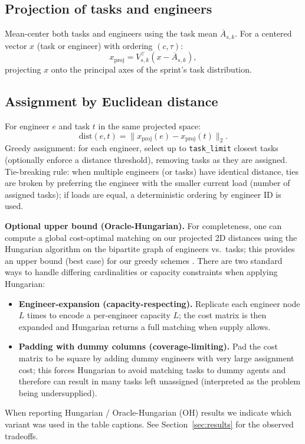 \documentclass[journal]{IEEEtran}
\begin{document}
\subsection{Projection of tasks and engineers}
Mean-center both tasks and engineers using the task mean \(\overline{A}_{s,k}\). For a centered vector $x$ (task or engineer) with ordering \((c,\tau)\):
\begin{equation}
\label{eq:proj}
x_{\text{proj}} = V_{s,k}^\top (x - \overline{A}_{s,k}),
\end{equation}
projecting $x$ onto the principal axes of the sprint's task distribution.

\subsection{Assignment by Euclidean distance}
For engineer $e$ and task $t$ in the same projected space:
\begin{equation}
\label{eq:euclid}
\mathrm{dist}(e,t) = \| x_{\text{proj}}(e) - x_{\text{proj}}(t) \|_2.
\end{equation}
Greedy assignment: for each engineer, select up to \texttt{task\_limit} closest tasks (optionally enforce a distance threshold), removing tasks as they are assigned. Tie-breaking rule: when multiple engineers (or tasks) have identical distance, ties are broken by preferring the engineer with the smaller current load (number of assigned tasks); if loads are equal, a deterministic ordering by engineer ID is used.

\noindent\textbf{Optional upper bound (Oracle-Hungarian).} For completeness, one can compute a global cost-optimal matching on our projected 2D distances using the Hungarian algorithm on the bipartite graph of engineers vs.\ tasks; this provides an upper bound (best case) for our greedy schemes \cite{kuhn1955hungarian,BurkardAssignmentBook}. There are two standard ways to handle differing cardinalities or capacity constraints when applying Hungarian:
\begin{itemize}[leftmargin=*]
    \item \textbf{Engineer-expansion (capacity-respecting).} Replicate each engineer node $L$ times to encode a per-engineer capacity $L$; the cost matrix is then expanded and Hungarian returns a full matching when supply allows.
    \item \textbf{Padding with dummy columns (coverage-limiting).} Pad the cost matrix to be square by adding dummy engineers with very large assignment cost; this forces Hungarian to avoid matching tasks to dummy agents and therefore can result in many tasks left unassigned (interpreted as the problem being undersupplied).
\end{itemize}
When reporting Hungarian / Oracle-Hungarian (OH) results we indicate which variant was used in the table captions. See Section~\ref{sec:results} for the observed tradeoffs.
\end{document}
